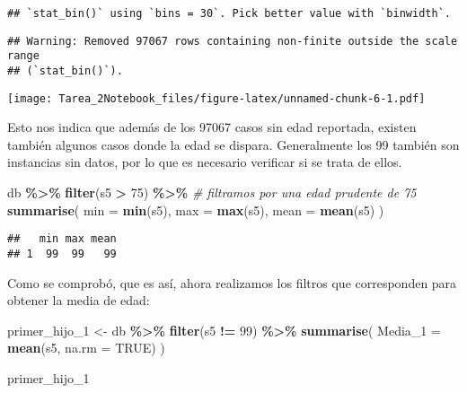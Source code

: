 \documentclass[
]{article}
\newenvironment{Shaded}{\begin{snugshade}}{\end{snugshade}}
\newcommand{\AttributeTok}[1]{\textcolor[rgb]{0.13,0.29,0.53}{#1}}
\newcommand{\CommentTok}[1]{\textcolor[rgb]{0.56,0.35,0.01}{\textit{#1}}}
\newcommand{\ConstantTok}[1]{\textcolor[rgb]{0.56,0.35,0.01}{#1}}
\newcommand{\DecValTok}[1]{\textcolor[rgb]{0.00,0.00,0.81}{#1}}
\newcommand{\FunctionTok}[1]{\textcolor[rgb]{0.13,0.29,0.53}{\textbf{#1}}}
\newcommand{\NormalTok}[1]{#1}
\newcommand{\OtherTok}[1]{\textcolor[rgb]{0.56,0.35,0.01}{#1}}
\newcommand{\SpecialCharTok}[1]{\textcolor[rgb]{0.81,0.36,0.00}{\textbf{#1}}}
\begin{document}
\begin{verbatim}
## `stat_bin()` using `bins = 30`. Pick better value with `binwidth`.
\end{verbatim}

\begin{verbatim}
## Warning: Removed 97067 rows containing non-finite outside the scale range
## (`stat_bin()`).
\end{verbatim}

\texttt{[image: Tarea\_2Notebook\_files/figure-latex/unnamed-chunk-6-1.pdf]}

Esto nos indica que además de los 97067 casos sin edad reportada,
existen también algunos casos donde la edad se dispara. Generalmente los
99 también son instancias sin datos, por lo que es necesario verificar
si se trata de ellos.

\begin{Shaded}
\begin{Highlighting}[]
\NormalTok{db }\SpecialCharTok{\%\textgreater{}\%} \FunctionTok{filter}\NormalTok{(s5 }\SpecialCharTok{\textgreater{}} \DecValTok{75}\NormalTok{) }\SpecialCharTok{\%\textgreater{}\%} \CommentTok{\# filtramos por una edad prudente de 75}
  \FunctionTok{summarise}\NormalTok{(}
    \AttributeTok{min =} \FunctionTok{min}\NormalTok{(s5),}
    \AttributeTok{max =} \FunctionTok{max}\NormalTok{(s5),}
    \AttributeTok{mean =} \FunctionTok{mean}\NormalTok{(s5)}
\NormalTok{  )}
\end{Highlighting}
\end{Shaded}

\begin{verbatim}
##   min max mean
## 1  99  99   99
\end{verbatim}

Como se comprobó, que es así, ahora realizamos los filtros que
corresponden para obtener la media de edad:

\begin{Shaded}
\begin{Highlighting}[]
\NormalTok{primer\_hijo\_1 }\OtherTok{\textless{}{-}}\NormalTok{ db }\SpecialCharTok{\%\textgreater{}\%}
  \FunctionTok{filter}\NormalTok{(s5 }\SpecialCharTok{!=} \DecValTok{99}\NormalTok{) }\SpecialCharTok{\%\textgreater{}\%}
  \FunctionTok{summarise}\NormalTok{(}
    \AttributeTok{Media\_1 =} \FunctionTok{mean}\NormalTok{(s5, }\AttributeTok{na.rm =} \ConstantTok{TRUE}\NormalTok{)}
\NormalTok{)}

\NormalTok{primer\_hijo\_1}
\end{Highlighting}
\end{Shaded}
\end{document}
